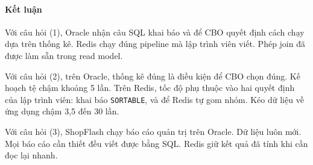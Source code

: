 \paragraph{Kết luận}\label{sec:q-summary}

Với câu hỏi (1), Oracle nhận câu SQL khai báo và để CBO quyết định cách chạy dựa trên thống kê. Redis chạy đúng pipeline mà lập trình viên viết. Phép join đã được làm sẵn trong read model.

Với câu hỏi (2), trên Oracle, thống kê đúng là điều kiện để CBO chọn đúng. Kế hoạch tệ chậm khoảng 5 lần. Trên Redis, tốc độ phụ thuộc vào hai quyết định của lập trình viên: khai báo \texttt{SORTABLE}, và để Redis tự gom nhóm. Kéo dữ liệu về ứng dụng chậm 3,5 đến 30 lần.

Với câu hỏi (3), ShopFlash chạy báo cáo quản trị trên Oracle. Dữ liệu luôn mới. Mọi báo cáo cần thiết đều viết được bằng SQL. Redis giữ kết quả đã tính khi cần đọc lại nhanh.

\endgroup
